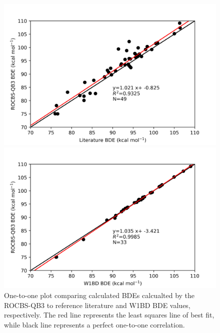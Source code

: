 \begin{figure}[H]
  \hspace*{-1.5cm}
  \begin{minipage}{8cm}
    \centering
    \includegraphics[width=\textwidth]{figures/lit-rocbsqb3}
  \end{minipage}%
  \begin{minipage}{8cm}
    \centering
    \includegraphics[width=\textwidth]{figures/w1bd-rocbsqb3}
  \end{minipage}
  \caption[One-to-one plot comparing calculated BDEs calculated by ROCBS-QB3 to literature and W1BD BDEs.]{One-to-one plot comparing calculated BDEs calcualted by the ROCBS-QB3 to reference literature\protect\cite{Luo2002} and W1BD BDE values, respectively. The red line represents the least squares line of best fit, while black line represents a perfect one-to-one correlation.}
  \label{fig:1-1-ROCBSQB3}
\end{figure}

